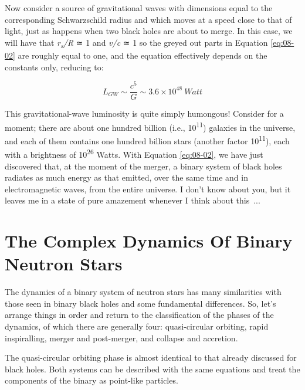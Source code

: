 Now consider a source of gravitational waves with dimensions equal to the corresponding
Schwarzschild radius and which moves at a speed close to that of light, just as happens
when two black holes are about to merge. In this case, we will have that
\emph{r\textsubscript{s}/R} ≃ 1 and \emph{v/c} ≃ 1 so the greyed out parts in Equation
\eqref{eq:08-02} are roughly equal to one, and the equation effectively depends on the constants
only, reducing to:

\begin{equation}\label{eq:08-02}
L_{GW}\sim\frac{c^{5}}{G}\sim 3.6 \times 10^{48}\ Watt
\end{equation}

This gravitational-wave luminosity is quite simply humongous!
Consider for a moment; there are about one hundred billion (i.e.,
10\textsuperscript{11}) galaxies in the universe, and each of them contains one hundred
billion stars (another factor 10\textsuperscript{11}), each with a brightness of
10\textsuperscript{26} Watts. With Equation \eqref{eq:08-02}, we have just discovered that, at the
moment of the merger, a binary system of black holes radiates as much energy as that
emitted, over the same time and in electromagnetic waves, from the entire universe. I
don't know about you, but it leaves me in a state of pure amazement whenever I think
about this~...

\section{The Complex Dynamics Of Binary Neutron Stars}\label{sec:08-neutron-stars}

The dynamics of a binary system of neutron stars
has many similarities with those seen in binary black holes and some fundamental
differences. So, let's arrange things in order and return to the classification of the
phases of the dynamics, of which there are generally four: quasi-circular orbiting,
rapid inspiralling, merger and post-merger, and collapse and
accretion.

The quasi-circular orbiting phase is almost identical to that already discussed for
black holes. Both systems can be described with the same equations and treat the
components of the binary as point-like particles.


